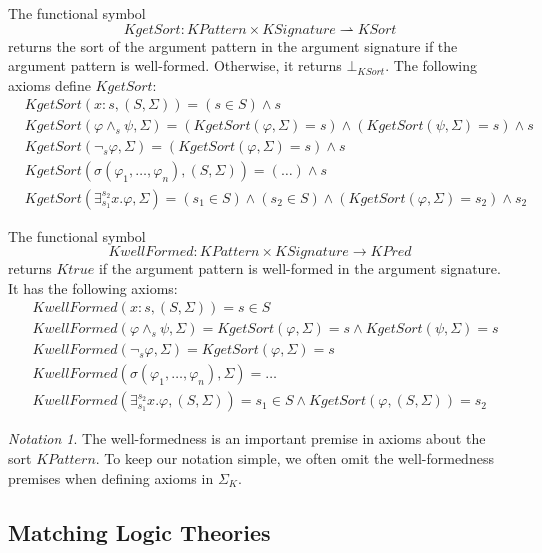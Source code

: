 \documentclass[UTF8,11pt]{article}
\newcounter{thmcounter}
\theoremstyle{plain}
\theoremstyle{definition}
\theoremstyle{remark}
\newtheorem{notation}[thmcounter]{Notation}
\newcommand{\cln}{{:}}
\newcommand{\KPred}{\mathit{KPred}}
\newcommand{\Ktrue}{\mathit{Ktrue}}
\newcommand{\KSort}{\mathit{KSort}}
\newcommand{\KPattern}{\mathit{KPattern}}
\newcommand{\kand}{\wedge}
\newcommand{\knot}{\neg}
\newcommand{\kexists}{\exists}
\newcommand{\KSignature}{\mathit{KSignature}}
\newcommand{\KwellFormed}{\mathit{KwellFormed}}
\newcommand{\KgetSort}{\mathit{KgetSort}}
\begin{document}
The functional symbol
$$\KgetSort \colon \KPattern \times \KSignature \rightharpoonup \KSort$$
returns the sort of the argument pattern in the argument signature if the argument pattern is well-formed.
Otherwise, it returns $\bot_\KSort$.
The following axioms define $\KgetSort$:
\begin{align*}
&\KgetSort(x \cln s, (S, \Sigma)) = (s \in S) \wedge s
\\
&\KgetSort(\varphi \kand_s \psi, \Sigma) = (\KgetSort(\varphi, \Sigma) = s) \wedge (\KgetSort(\psi, \Sigma) = s) \wedge s
\\
&\KgetSort(\knot_s \varphi, \Sigma) = (\KgetSort(\varphi, \Sigma) = s) \wedge s
\\
&\KgetSort(\sigma(\varphi_1,\dots,\varphi_n), (S, \Sigma)) = (\dots) \wedge s
\\
&\KgetSort(\kexists_{s_1}^{s_2} x . \varphi, \Sigma) = (s_1 \in S) \wedge (s_2 \in S) \wedge (\KgetSort(\varphi, \Sigma) = s_2) \wedge s_2
\end{align*}

The functional symbol 
$$\KwellFormed \colon \KPattern \times \KSignature \to \KPred$$ returns $\Ktrue$ if the argument pattern is well-formed in the argument signature.
It has the following axioms:
\begin{align*}
&\KwellFormed(x \cln s, (S, \Sigma)) = s \in S
\\
&\KwellFormed(\varphi \kand_s \psi, \Sigma) = \KgetSort(\varphi, \Sigma) = s \wedge \KgetSort(\psi, \Sigma) = s
\\
&\KwellFormed(\knot_s \varphi, \Sigma) = \KgetSort(\varphi, \Sigma) = s
\\
&\KwellFormed(\sigma(\varphi_1, \dots, \varphi_n), \Sigma) = \dots
\\
&\KwellFormed(\kexists_{s_1}^{s_2} x . \varphi, (S, \Sigma)) = s_1 \in S \wedge \KgetSort(\varphi, (S, \Sigma)) = s_2
\end{align*}

\begin{notation}\label{omit-well-formedness-premises}
	The well-formedness is an important premise in axioms about the sort 
	$\KPattern$. To keep our notation simple, we often omit the well-formedness 
	premises when defining axioms in $\Sigma_K$.
\end{notation}

\subsection{Matching Logic Theories}
\end{document}
